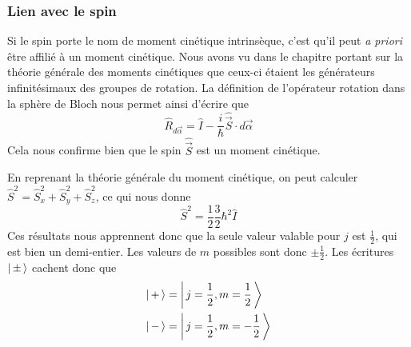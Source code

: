         \subsubsection{Lien avec le spin}

        Si le spin porte le nom de moment cinétique intrinsèque, c’est qu’il peut \textit{a priori} être affilié à un moment cinétique. Nous avons vu dans le chapitre portant sur la théorie générale des moments cinétiques que ceux-ci étaient les générateurs infinitésimaux des groupes de rotation. La définition de l’opérateur rotation dans la sphère de Bloch nous permet ainsi d’écrire que 
        \[ \hat{R}_{d\vec{\alpha}} = \hat{I} - \frac{i}{\hbar} \hat{\vec{S}} \cdot d\vec{\alpha} \]   
        Cela nous confirme bien que le spin $\hat{\vec{S}}$ est un moment cinétique.

        En reprenant la théorie générale du moment cinétique, on peut calculer $\hat{S}^2 = \hat{S}_x^2 + \hat{S}_{y}^2 + \hat{S}_z^2$, ce qui nous donne 
        \[ \hat{S}^2 = \frac{1}{2} \frac{3}{2} \hbar^2 \hat{I} \]   
        Ces résultats nous apprennent donc que la seule valeur valable pour $j$ est $\frac{1}{2}$, qui est bien un demi-entier. Les valeurs de $m$ possibles sont donc $\pm \frac{1}{2}$. Les écritures $\left| \, \pm \, \right>$ cachent donc que 
        \begin{align*}
            \left| \, + \, \right> &= \left| \, j = \frac{1}{2}, m = \frac{1}{2} \, \right> \\
            \left| \, - \, \right> &= \left| \, j = \frac{1}{2}, m = -\frac{1}{2} \, \right> \\
        \end{align*}




        